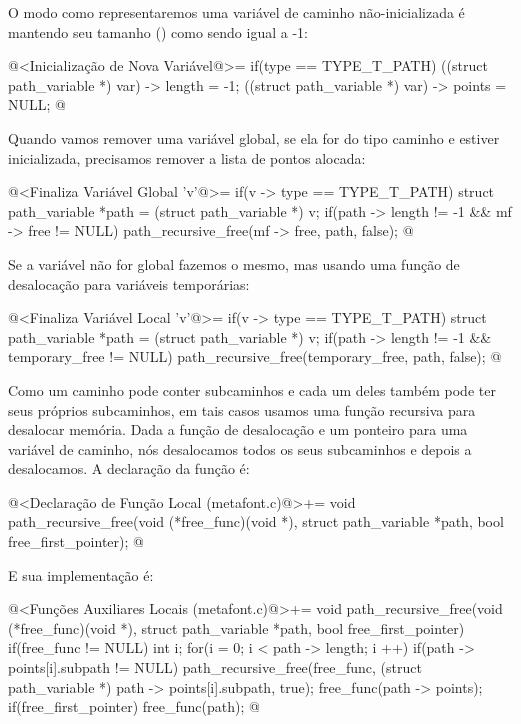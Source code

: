 O modo como representaremos uma variável de caminho não-inicializada é
mantendo seu tamanho () como sendo igual a -1:

\iniciocodigo
@<Inicialização de Nova Variável@>=
if(type == TYPE_T_PATH){
  ((struct path_variable *) var) -> length = -1;
  ((struct path_variable *) var) -> points = NULL;
}
@
\fimcodigo

Quando vamos remover uma variável global, se ela for do tipo caminho e
estiver inicializada, precisamos remover a lista de pontos alocada:

\iniciocodigo
@<Finaliza Variável Global 'v'@>=
if(v -> type == TYPE_T_PATH){
  struct path_variable *path = (struct path_variable *) v;
  if(path -> length != -1 && mf -> free != NULL)
    path_recursive_free(mf -> free, path, false);
}
@
\fimcodigo

Se a variável não for global fazemos o mesmo, mas usando uma função de
desalocação para variáveis temporárias:


\iniciocodigo
@<Finaliza Variável Local 'v'@>=
if(v -> type == TYPE_T_PATH){
  struct path_variable *path = (struct path_variable *) v;
  if(path -> length != -1 && temporary_free != NULL)
    path_recursive_free(temporary_free, path, false);
}
@
\fimcodigo

Como um caminho pode conter subcaminhos e cada um deles também pode
ter seus próprios subcaminhos, em tais casos usamos uma função
recursiva para desalocar memória. Dada a função de desalocação e um
ponteiro para uma variável de caminho, nós desalocamos todos os seus
subcaminhos e depois a desalocamos. A declaração da função é:

\iniciocodigo
@<Declaração de Função Local (metafont.c)@>+=
void path_recursive_free(void (*free_func)(void *),
                         struct path_variable *path,
                         bool free_first_pointer);
@
\fimcodigo

E sua implementação é:

\iniciocodigo
@<Funções Auxiliares Locais (metafont.c)@>+=
void path_recursive_free(void (*free_func)(void *),
                         struct path_variable *path,
                         bool free_first_pointer){
  if(free_func != NULL){
    int i;
    for(i = 0; i < path -> length; i ++){
      if(path -> points[i].subpath != NULL)
        path_recursive_free(free_func, (struct path_variable *)
                                       path -> points[i].subpath, true);
    }
    free_func(path -> points);
    if(free_first_pointer)
      free_func(path);
  }
}
@
\fimcodigo


